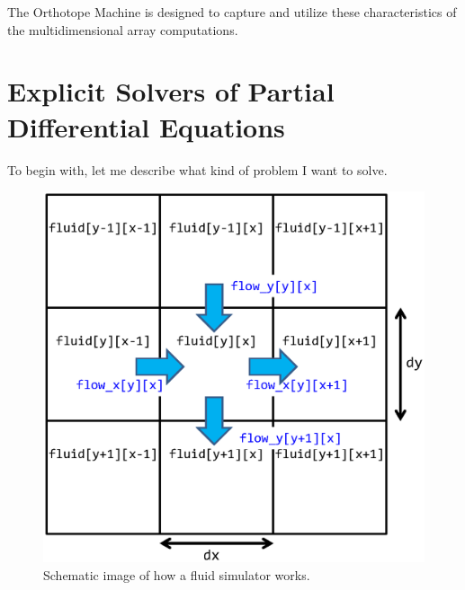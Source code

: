 \documentclass[twocolumn]{article}
\begin{document}
The Orthotope Machine is designed to capture and utilize these
characteristics of the multidimensional array computations.

\section{Explicit Solvers of Partial Differential Equations}

To begin with, let me describe what kind of problem I want to solve.

\begin{figure}
  \includegraphics[scale=0.5]{figure/fluid.eps}
  \caption {Schematic image of how a fluid simulator
    works. }\label{FigureFluidScheme}
\end{figure}
\end{document}
